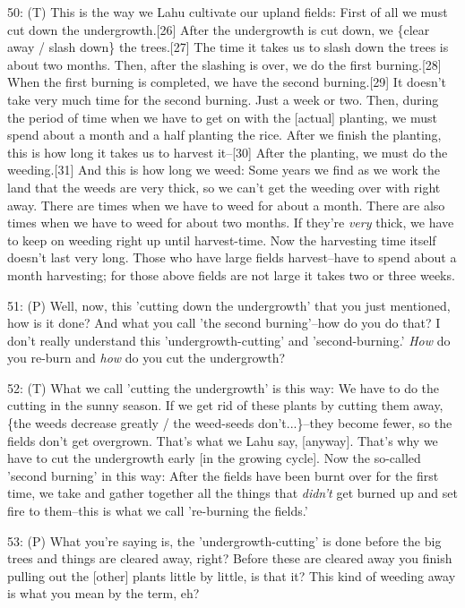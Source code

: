 50: (T) This is the way we Lahu cultivate our upland fields: First of all we must
cut down the undergrowth.[26] After the undergrowth is cut down, we \{clear away
/ slash down\} the trees.[27] The time it takes us to slash down the trees is about
two months. Then, after the slashing is over, we do the first burning.[28] When
the first burning is completed, we have the second burning.[29] It doesn't take
very much time for the second burning. Just a week or two. Then, during the period
of time when we have to get on with the [actual] planting, we must spend about
a month and a half planting the rice. After we finish the planting, this is how
long it takes us to harvest it--[30] After the planting, we must do the weeding.[31]
And this is how long we weed: Some years we find as we work the land that the weeds
are very thick, so we can't get the weeding over with right away. There are times
when we have to weed for about a month. There are also times when we have to weed
for about two months. If they're \textit{very} thick, we have to keep on weeding
right up until harvest-time. Now the harvesting time itself doesn't last very long.
Those who have large fields harvest--have to spend about a month harvesting; for
those above fields are not large it takes two or three weeks.

51: (P) Well, now, this 'cutting down the undergrowth' that you just mentioned,
how is it done? And what you call 'the second burning'--how do you do that? I don't
really understand this 'undergrowth-cutting' and 'second-burning.' \textit{How
}do you re-burn and \textit{how} do you cut the undergrowth?

52: (T) What we call 'cutting the undergrowth' is this way: We have to do the cutting
in the sunny season. If we get rid of these plants by cutting them away, \{the
weeds decrease greatly / the weed-seeds don't...\}--they become fewer, so the fields
don't get overgrown. That's what we Lahu say, [anyway]. That's why we have to cut
the undergrowth early [in the growing cycle]. Now the so-called 'second burning'
in this way: After the fields have been burnt over for the first time, we take
and gather together all the things that \textit{didn't} get burned up and set fire
to them--this is what we call 're-burning the fields.'

53: (P) What you're saying is, the 'undergrowth-cutting' is done before the big
trees and things are cleared away, right? Before these are cleared away you finish
pulling out the [other] plants little by little, is that it? This kind of weeding
away is what you mean by the term, eh?

